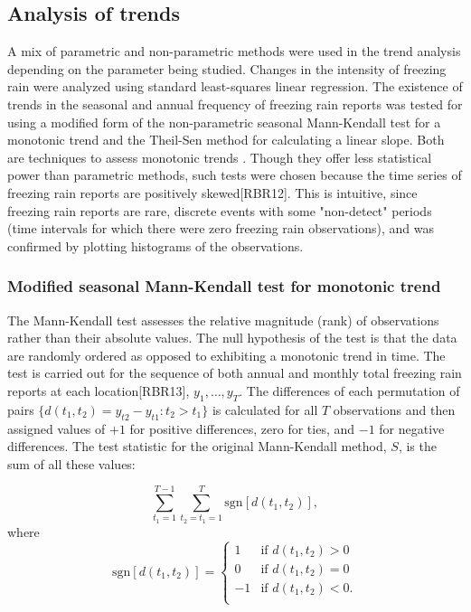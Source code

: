 \documentclass[twocol]{ametsoc}
\begin{document}
\subsection{Analysis of trends}

A mix of parametric and non-parametric methods were used in the trend analysis depending on the parameter being studied. Changes in the intensity of freezing rain were analyzed using standard least-squares linear regression. The existence of trends in the seasonal and annual frequency of freezing rain reports was tested for using a modified form of the non-parametric seasonal Mann-Kendall test for a monotonic trend and the Theil-Sen method for calculating a linear slope. Both are techniques to assess monotonic trends \citep{chandler2011statistical}. Though they offer less statistical power than parametric methods, such tests were chosen because the time series of freezing rain reports are positively skewed[RBR12]. This is intuitive, since freezing rain reports are rare, discrete events with some "non-detect" periods (time intervals for which there were zero freezing rain observations), and was confirmed by plotting histograms of the observations.



\subsubsection{Modified seasonal Mann-Kendall test for monotonic trend}

The Mann-Kendall test assesses the relative magnitude (rank) of observations rather than their absolute values. The null hypothesis of the test is that the data are randomly ordered as opposed to exhibiting a monotonic trend in time. The test is carried out for the sequence of both annual and monthly total freezing rain reports at each location[RBR13], $y_1,\ldots,y_T$. The differences of each permutation of pairs $\{d(t_1,t_2)=y_{t2}-y_{t1}:t_2>t_1\}$ is calculated for all $T$ observations and then assigned values of $+1$ for positive differences, zero for ties, and $-1$ for negative differences. The test statistic for the original Mann-Kendall method, $S$, is the sum of all these values:



\[\sum_{t_1=1}^{T-1}\sum_{t_2=t_1=1}^T\text{sgn}[d(t_1,t_2)],\] where\\

\[\text{sgn}[d(t_1,t_2)]=\begin{cases} 1 & \text{if } d(t_1,t_2)>0\\ 0 & \text{if } d(t_1,t_2)=0\\ -1 & \text{if } d(t_1,t_2)<0.\\ \end{cases}\]
\end{document}
